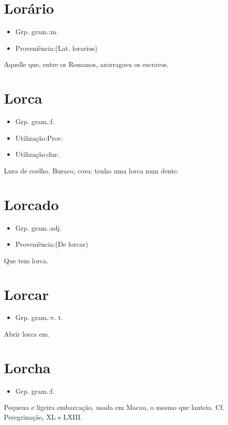 \section{Lorário}
\begin{itemize}
\item {Grp. gram.:m.}
\end{itemize}
\begin{itemize}
\item {Proveniência:(Lat. \textunderscore lorarius\textunderscore )}
\end{itemize}
Aquelle que, entre os Romanos, azorragava os escravos.
\section{Lorca}
\begin{itemize}
\item {Grp. gram.:f.}
\end{itemize}
\begin{itemize}
\item {Utilização:Prov.}
\end{itemize}
\begin{itemize}
\item {Utilização:dur.}
\end{itemize}
Lura de coelho.
Buraco, cova: \textunderscore tenho uma lorca num dente\textunderscore .
\section{Lorcado}
\begin{itemize}
\item {Grp. gram.:adj.}
\end{itemize}
\begin{itemize}
\item {Proveniência:(De \textunderscore lorcar\textunderscore )}
\end{itemize}
Que tem lorca.
\section{Lorcar}
\begin{itemize}
\item {Grp. gram.:v. t.}
\end{itemize}
Abrir lorca em.
\section{Lorcha}
\begin{itemize}
\item {Grp. gram.:f.}
\end{itemize}
Pequena e ligeira embarcação, usada em Macau, o mesmo que \textunderscore lanteia\textunderscore . Cf. \textunderscore Peregrinação\textunderscore , XL e LXIII.
